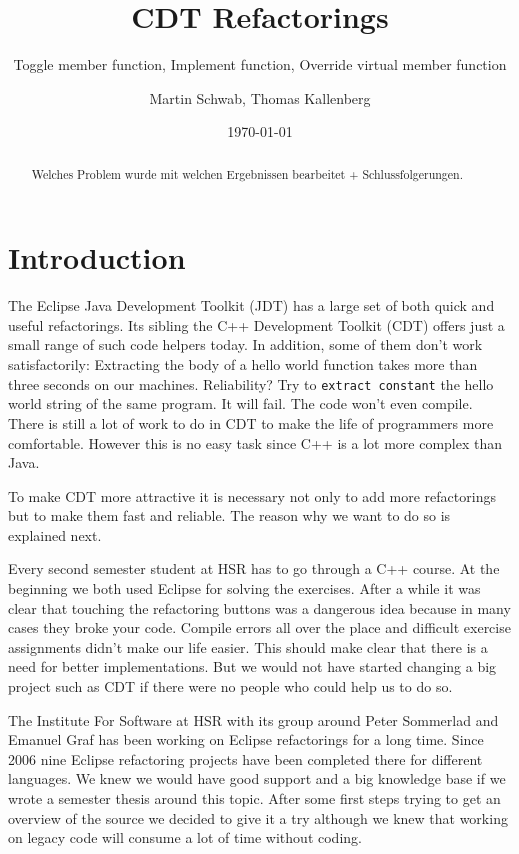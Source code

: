 \documentclass[a4paper,10pt,abstract=on]{scrreprt}
\title{CDT Refactorings}
\subtitle{Toggle member function, Implement function, Override virtual member function}
\date{\today}
\author{Martin Schwab, Thomas Kallenberg}
\begin{document}
\maketitle
{}

\begin{abstract}
Welches Problem wurde mit welchen Ergebnissen bearbeitet + Schlussfolgerungen.
\end{abstract}

\tableofcontents
{}

\chapter{Introduction}
The Eclipse Java Development Toolkit (JDT) has a large set of both quick and useful refactorings. Its sibling the C++ Development Toolkit (CDT) offers just a small range of such code helpers today. In addition, some of them don't work satisfactorily: Extracting the body of a hello world function takes more than three seconds on our machines. Reliability? Try to \texttt{extract constant} the hello world string of the same program. It will fail. The code won't even compile. There is still a lot of work to do in CDT to make the life of programmers more comfortable. However this is no easy task since C++ is a lot more complex than Java.

To make CDT more attractive it is necessary not only to add more refactorings but to make them fast and reliable. The reason why we want to do so is explained next.

Every  second semester student at HSR has to go through a C++ course. At the beginning we both used Eclipse for solving the exercises. After a while it was clear that touching the refactoring buttons was a dangerous idea because in many cases they broke your code. Compile errors all over the place and difficult exercise assignments didn't make our life easier. This should make clear that there is a need for better implementations. But we would not have started changing a big project such as CDT if there were no people who could help us to do so.

The  Institute For Software at HSR with its group around Peter Sommerlad and Emanuel Graf has been working on Eclipse refactorings for a long time. Since 2006 nine Eclipse refactoring projects have been completed there for different languages. We knew we would have good support and a big knowledge base if we wrote a semester thesis around this topic. After some first steps trying to get an overview of the source we decided to give it a try although we knew that working on legacy code will consume a lot of time without coding.
\end{document}
